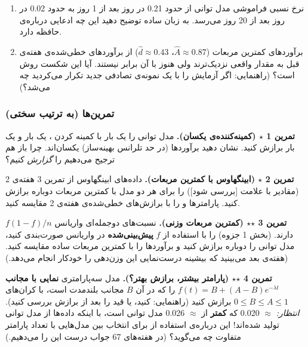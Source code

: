 \begin{enumerate}
\def\labelenumi{\arabic{enumi}.}
\tightlist
\item
  نرخ نسبی فراموشی مدل توانی از حدود 0.21 در روز بعد از 1 روز به حدود
  0.02 در روز بعد از 20 روز می‌رسد. به زبان ساده توضیح دهید این چه ادعایی
  درباره‌ی حافظه دارد.
\item
  برآوردهای کمترین مربعات (\(\hat A \approx 0.87\)،
  \(\hat d \approx 0.43\)) از برآوردهای خطی‌شده‌ی هفته‌ی قبل به مقدار واقعی
  نزدیک‌ترند ولی هنوز با آن برابر نیستند. آیا این شکست روش است؟
  (راهنمایی: اگر آزمایش را با یک نمونه‌ی تصادفی جدید تکرار می‌کردید چه
  می‌شد؟)
\end{enumerate}

\subsubsection{تمرین‌ها (به ترتیب سختی)}

\textbf{تمرین 1 \ensuremath{\star} (کمینه‌کننده‌ی یکسان).} مدل توانی را یک بار با کمینه
کردن ، یک بار  و یک بار  برازش کنید. نشان دهید
برآوردها (در حد تلرانس بهینه‌ساز) یکسان‌اند. چرا باز هم ترجیح می‌دهیم
 را \emph{گزارش} کنیم؟

\textbf{تمرین 2 \ensuremath{\star} (ابینگهاوس با کمترین مربعات).} داده‌های 
ابینگهاوس از تمرین 3 هفته‌ی 2 (مقادیر با علامت {[}بررسی شود{]}) را برای
هر دو مدل با کمترین مربعات دوباره برازش کنید. پارامترها و  را
با برازش‌های خطی‌شده‌ی هفته‌ی 2 مقایسه کنید.

\textbf{تمرین 3 \ensuremath{\star}\ensuremath{\star} (کمترین مربعات وزنی).} نسبت‌های دوجمله‌ای واریانس
\(f(1-f)/n\) دارند.  (بخش 1 جزوه) را با استفاده از \(f\)
\textbf{پیش‌بینی‌شده} در واریانس صورت‌بندی کنید، مدل توانی را دوباره برازش
کنید و برآوردها را با کمترین مربعات ساده مقایسه کنید. (هفته‌ی بعد می‌بینید
که بیشینه درست‌نمایی این وزن‌دهی را خودکار انجام می‌دهد.)

\textbf{تمرین 4 \ensuremath{\star}\ensuremath{\star} (پارامتر بیشتر، برازش بهتر؟).} مدل سه‌پارامتری
\textbf{نمایی با مجانب} \(f(t) = B + (A - B)e^{-\lambda t}\) را که در آن
\(B\) مجانب بلندمدت است، با کران‌های \(0 \le B \le A \le 1\) برازش کنید
(راهنمایی:  کنید، یا قید را بعد از برازش بررسی کنید).
\emph{انتظار:}  \ensuremath{\approx} 0.020 که \textbf{کمتر} از  \ensuremath{\approx} 0.026 مدل
توانی است، با اینکه داده‌ها از مدل توانی تولید شده‌اند! این درباره‌ی
استفاده از  برای انتخاب بین مدل‌هایی با تعداد پارامتر متفاوت چه
می‌گوید؟ (در هفته‌های 6\lr{--}7 جواب درست این را می‌دهیم.)

